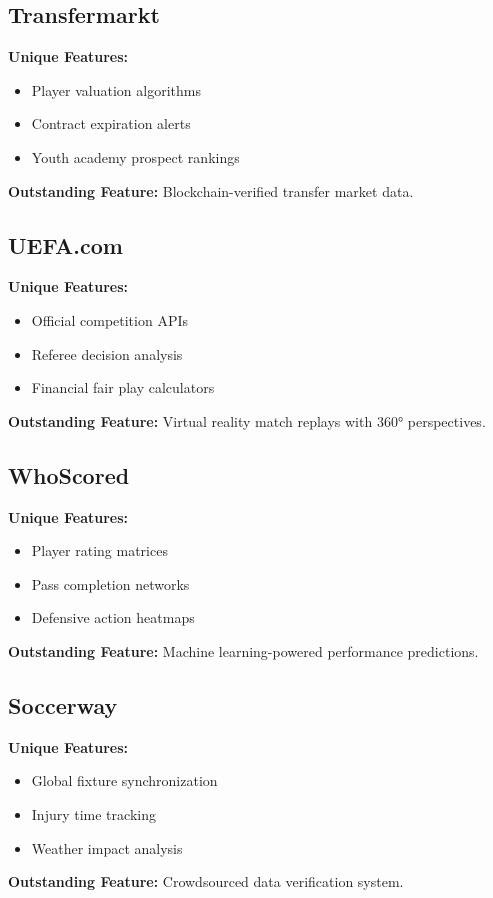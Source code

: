 \subsection{Transfermarkt}
\textbf{Unique Features:}
\begin{itemize}
    \item Player valuation algorithms
    \item Contract expiration alerts
    \item Youth academy prospect rankings
\end{itemize}
\textbf{Outstanding Feature:} Blockchain-verified transfer market data\parencite{transfermarkt}.

\subsection{UEFA.com}
\textbf{Unique Features:}
\begin{itemize}
    \item Official competition APIs
    \item Referee decision analysis
    \item Financial fair play calculators
\end{itemize}
\textbf{Outstanding Feature:} Virtual reality match replays with 360° perspectives\parencite{uefa}.

\subsection{WhoScored}
\textbf{Unique Features:}
\begin{itemize}
    \item Player rating matrices
    \item Pass completion networks
    \item Defensive action heatmaps
\end{itemize}
\textbf{Outstanding Feature:} Machine learning-powered performance predictions\parencite{whoscored}.

\subsection{Soccerway}
\textbf{Unique Features:}
\begin{itemize}
    \item Global fixture synchronization
    \item Injury time tracking
    \item Weather impact analysis
\end{itemize}
\textbf{Outstanding Feature:} Crowdsourced data verification system\parencite{soccerway}.


